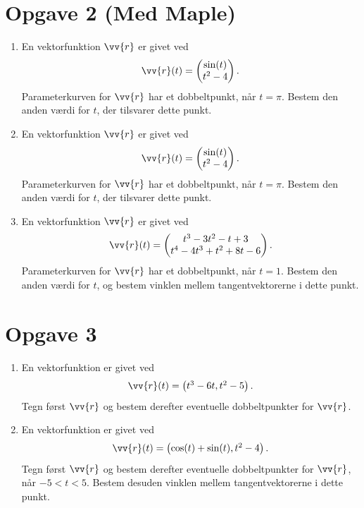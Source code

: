 \section*{Opgave 2 (Med Maple)}
\begin{enumerate}[label=\roman*)]
	\item En vektorfunktion $\vv{r}$ er givet ved
	\begin{align*}
		\vv{r}(t) = 
		\begin{pmatrix}
			\sin(t) \\
			t^2-4
		\end{pmatrix}.
	\end{align*}
	Parameterkurven for $\vv{r}$ har et dobbeltpunkt, når $t=\pi$. Bestem den anden værdi for $t$, der tilsvarer dette punkt. 
	\item En vektorfunktion $\vv{r}$ er givet ved
	\begin{align*}
		\vv{r}(t) = 
		\begin{pmatrix}
			\sin(t) \\
			t^2-4
		\end{pmatrix}.
	\end{align*}
	Parameterkurven for $\vv{r}$ har et dobbeltpunkt, når $t=\pi$. Bestem den anden værdi for $t$, der tilsvarer dette punkt. 
	\item En vektorfunktion $\vv{r}$ er givet ved
	\begin{align*}
		\vv{r}(t) = 
		\begin{pmatrix}
			t^3-3t^2-t+3 \\
			t^4-4t^3+t^2+8t-6
		\end{pmatrix}.
	\end{align*}
	Parameterkurven for $\vv{r}$ har et dobbeltpunkt, når $t=1$. Bestem den anden værdi for $t$, og bestem vinklen mellem tangentvektorerne i dette punkt. 
\end{enumerate}


\section*{Opgave 3}

\begin{enumerate}[label=\roman*)]
	\item En vektorfunktion er givet ved
	\begin{align*}
		\vv{r}(t) = 
		\begin{pmatrix}
			t^3-6t,t^2-5
		\end{pmatrix}.
	\end{align*}
	Tegn først $\vv{r}$ og bestem derefter eventuelle dobbeltpunkter for $\vv{r}$.
	\item En vektorfunktion er givet ved
	\begin{align*}
		\vv{r}(t) = 
		\begin{pmatrix}
			\cos(t)+\sin(t),t^2-4
		\end{pmatrix}.
	\end{align*}
	Tegn først $\vv{r}$ og bestem derefter eventuelle dobbeltpunkter for $\vv{r}$, \\ når $-5<t<5$. Bestem desuden vinklen mellem tangentvektorerne i dette punkt.
\end{enumerate}
